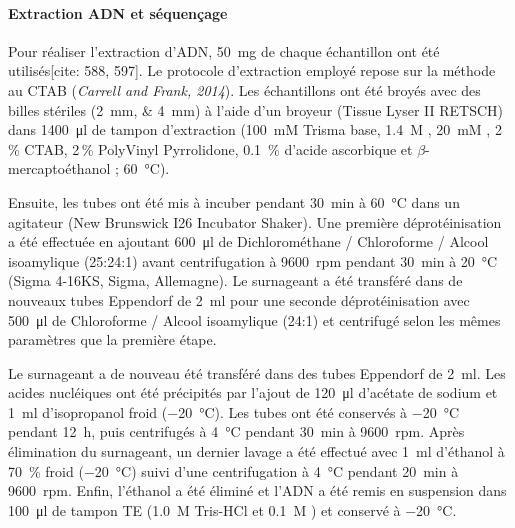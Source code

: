\documentclass[a4paper,12pt]{article}
\begin{document}
\paragraph{Extraction ADN et séquençage}
Pour réaliser l'extraction d'ADN, \qty{50}{\mg} de chaque échantillon ont été utilisés[cite: 588, 597]. Le protocole d'extraction employé repose sur la méthode au CTAB (\textit{Carrell and Frank, 2014}). Les échantillons ont été broyés avec des billes stériles (\qtylist{2;4}{\mm}) à l'aide d'un broyeur (Tissue Lyser II RETSCH) dans \qty{1400}{\micro\l} de tampon d'extraction (\SI{100}{mM} Trisma base, \SI{1.4}{M} , \SI{20}{mM}  , 2\,\% CTAB, 2\,\% PolyVinyl Pyrrolidone, \SI{0.1}{\%} d'acide ascorbique et $\beta$-mercaptoéthanol ; \qty{60}{\degreeCelsius}). 

Ensuite, les tubes ont été mis à incuber pendant \qty{30}{\minute} à \qty{60}{\degreeCelsius} dans un agitateur (New Brunswick I26 Incubator Shaker). Une première déprotéinisation a été effectuée en ajoutant \qty{600}{\micro\l} de Dichlorométhane / Chloroforme / Alcool isoamylique (25:24:1) avant centrifugation à \qty{9600}{rpm} pendant \qty{30}{\minute} à \qty{20}{\degreeCelsius} (Sigma 4-16KS, Sigma, Allemagne). Le surnageant a été transféré dans de nouveaux tubes Eppendorf de \qty{2}{\ml} pour une seconde déprotéinisation avec \qty{500}{\micro\l} de Chloroforme / Alcool isoamylique (24:1) et centrifugé selon les mêmes paramètres que la première étape. 

Le surnageant a de nouveau été transféré dans des tubes Eppendorf de \qty{2}{\ml}. Les acides nucléiques ont été précipités par l'ajout de \qty{120}{\micro\l} d'acétate de sodium et \qty{1}{\ml} d'isopropanol froid (\qty{-20}{\degreeCelsius}). Les tubes ont été conservés à \qty{-20}{\degreeCelsius} pendant \qty{12}{\hour}, puis centrifugés à \qty{4}{\degreeCelsius} pendant \qty{30}{\minute} à \qty{9600}{rpm}. Après élimination du surnageant, un dernier lavage a été effectué avec \qty{1}{\ml} d'éthanol à \SI{70}{\%} froid (\qty{-20}{\degreeCelsius}) suivi d'une centrifugation à \qty{4}{\degreeCelsius} pendant \qty{20}{\minute} à \qty{9600}{rpm}. Enfin, l'éthanol a été éliminé et l'ADN a été remis en suspension dans \qty{100}{\micro\l} de tampon TE (\SI{1.0}{M} Tris-HCl et \SI{0.1}{M} ) et conservé à \qty{-20}{\degreeCelsius}.
\end{document}
